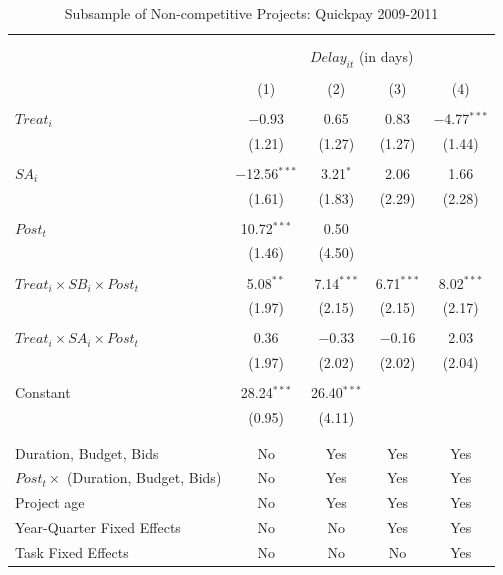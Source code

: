 \documentclass[
]{article}
\begin{document}
\begin{table}[H] \centering 
  \caption{Subsample of Non-competitive Projects: Quickpay 2009-2011} 
  \label{} 
\small 
\begin{tabular}{@{\extracolsep{-2pt}}lcccc} 
\\[-1.8ex]\hline 
\hline \\[-1.8ex] 
\\[-1.8ex] & \multicolumn{4}{c}{$Delay_{it}$ (in days)} \\ 
\\[-1.8ex] & (1) & (2) & (3) & (4)\\ 
\hline \\[-1.8ex] 
 $Treat_i$ & $-$0.93 & 0.65 & 0.83 & $-$4.77$^{***}$ \\ 
  & (1.21) & (1.27) & (1.27) & (1.44) \\ 
  & & & & \\ 
 $SA_i$ & $-$12.56$^{***}$ & 3.21$^{*}$ & 2.06 & 1.66 \\ 
  & (1.61) & (1.83) & (2.29) & (2.28) \\ 
  & & & & \\ 
 $Post_t$ & 10.72$^{***}$ & 0.50 &  &  \\ 
  & (1.46) & (4.50) &  &  \\ 
  & & & & \\ 
 $Treat_i \times SB_i \times Post_t$ & 5.08$^{**}$ & 7.14$^{***}$ & 6.71$^{***}$ & 8.02$^{***}$ \\ 
  & (1.97) & (2.15) & (2.15) & (2.17) \\ 
  & & & & \\ 
 $Treat_i \times SA_i \times Post_t$ & 0.36 & $-$0.33 & $-$0.16 & 2.03 \\ 
  & (1.97) & (2.02) & (2.02) & (2.04) \\ 
  & & & & \\ 
 Constant & 28.24$^{***}$ & 26.40$^{***}$ &  &  \\ 
  & (0.95) & (4.11) &  &  \\ 
  & & & & \\ 
\hline \\[-1.8ex] 
Duration, Budget, Bids & No & Yes & Yes & Yes \\ 
$Post_t \times $  (Duration, Budget, Bids) & No & Yes & Yes & Yes \\ 
Project age & No & Yes & Yes & Yes \\ 
Year-Quarter Fixed Effects & No & No & Yes & Yes \\ 
Task Fixed Effects & No & No & No & Yes \\ 

\end{tabular}
\end{table}
\end{document}
